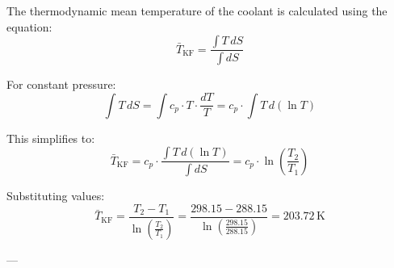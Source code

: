 The thermodynamic mean temperature of the coolant is calculated using the equation:  
\[
\bar{T}_{\text{KF}} = \frac{\int T \, dS}{\int dS}
\]  

For constant pressure:  
\[
\int T \, dS = \int c_p \cdot T \cdot \frac{dT}{T} = c_p \cdot \int T \, d(\ln T)
\]  

This simplifies to:  
\[
\bar{T}_{\text{KF}} = c_p \cdot \frac{\int T \, d(\ln T)}{\int dS} = c_p \cdot \ln \left( \frac{T_2}{T_1} \right)
\]  

Substituting values:  
\[
\bar{T}_{\text{KF}} = \frac{T_2 - T_1}{\ln \left( \frac{T_2}{T_1} \right)} = \frac{298.15 - 288.15}{\ln \left( \frac{298.15}{288.15} \right)} = 203.72 \, \text{K}
\]  

---